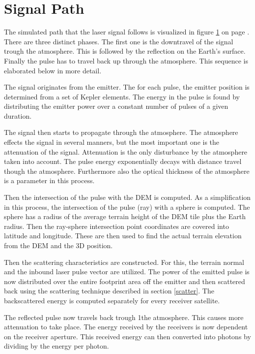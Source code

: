 \section{Signal Path}
\label{signPath}

The simulated path that the \ac{laser} signal follows is visualized in figure \ref{signPath} on 
page \pageref{signPath}. There are three distinct phases. The first one is the downtravel of the
signal trough the atmosphere. This is followed by the reflection on the Earth's surface. Finally the
pulse has to travel back up through the atmosphere. This sequence is elaborated below in more
detail.

The signal originates from the emitter. The for each pulse, the emitter position is determined from
a set of Kepler elements. The energy in the pulse is found by distributing the emitter power over a
constant number of pulses of a given duration.

The signal then starts to propagate through the atmosphere. The atmosphere effects the signal in
several manners, but the most important one is the attenuation of the signal. Attenuation is the
only disturbance by the atmosphere taken into account. The pulse energy exponentially decays with
distance travel though the atmosphere. Furthermore also the optical thickness of the atmosphere is a
parameter in this process.

Then the intersection of the pulse with the \ac{DEM} is computed. As a simplification in this
process, the intersection of the pulse (ray) with a sphere is computed. The sphere has a radius of
the average terrain height of the \ac{DEM} tile plus the Earth radius. Then the ray-sphere
intersection point coordinates are covered into latitude and longitude. These are then used to 
find the actual terrain elevation from the \ac{DEM} and the 3D position.

Then the scattering characteristics are constructed. For this, the terrain normal and the inbound
laser pulse vector are utilized. The power of the emitted pulse is now distributed over the entire
footprint area off the emitter and then scattered back using the scattering technique described in
section \ref{scatter}. The backscattered energy is computed separately for every receiver satellite.

The reflected pulse now travels back trough 1the atmosphere. This causes more attenuation to take
place. The energy received by the receivers is now dependent on the receiver aperture. This received
energy can then converted into photons by dividing by the energy per photon.

